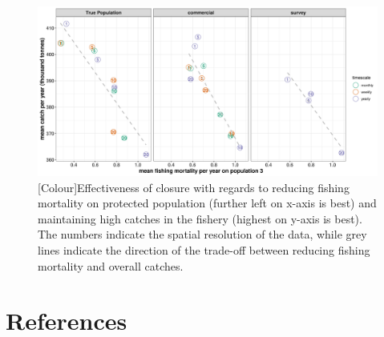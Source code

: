 \documentclass[review]{elsarticle}
\begin{document}
\begin{figure}[!ht]
	\centering
	\includegraphics[width =\linewidth]{./Plots/Closure_effectiveness_CF}
	\caption{[Colour]Effectiveness of closure with regards to reducing fishing
		mortality on protected population (further left on x-axis is
		best) and maintaining high catches in the fishery (highest on
		y-axis is best). The numbers indicate the spatial resolution of
		the data, while grey lines indicate the direction of the
		trade-off between reducing fishing mortality and overall
		catches.}
	\label{fig:ce}
\end{figure}	





\clearpage

\section*{References}


\end{document}
